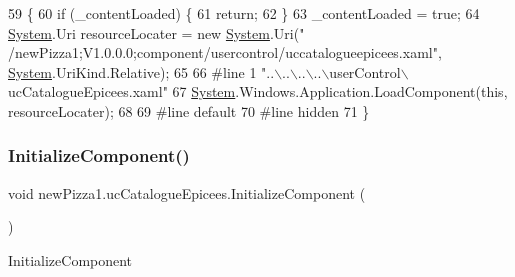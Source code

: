 \begin{DoxyCode}
59                                           \{
60             \textcolor{keywordflow}{if} (\_contentLoaded) \{
61                 \textcolor{keywordflow}{return};
62             \}
63             \_contentLoaded = \textcolor{keyword}{true};
64             \hyperlink{namespaceSystem}{System}.Uri resourceLocater = \textcolor{keyword}{new} \hyperlink{namespaceSystem}{System}.Uri(\textcolor{stringliteral}{"
      /newPizza1;V1.0.0.0;component/usercontrol/uccatalogueepicees.xaml"}, \hyperlink{namespaceSystem}{System}.UriKind.Relative);
65             
66 \textcolor{preprocessor}{            #line 1 "..\(\backslash\)..\(\backslash\)..\(\backslash\)..\(\backslash\)userControl\(\backslash\)ucCatalogueEpicees.xaml"}
67             \hyperlink{namespaceSystem}{System}.Windows.Application.LoadComponent(\textcolor{keyword}{this}, resourceLocater);
68             
69 \textcolor{preprocessor}{            #line default}
70 \textcolor{preprocessor}{            #line hidden}
71         \}
\end{DoxyCode}
\mbox{\label{classnewPizza1_1_1ucCatalogueEpicees_a88c609f29d5b46d57c31019576f8d7d8}} 
\subsubsection{\texorpdfstring{Initialize\+Component()}{InitializeComponent()}\hspace{0.1cm}{\footnotesize\ttfamily [5/6]}}
{\footnotesize\ttfamily void new\+Pizza1.\+uc\+Catalogue\+Epicees.\+Initialize\+Component (\begin{DoxyParamCaption}{ }\end{DoxyParamCaption})\hspace{0.3cm}{\ttfamily [inline]}}



Initialize\+Component 


